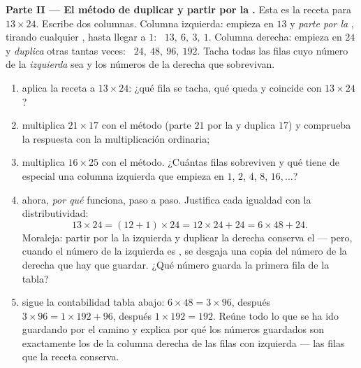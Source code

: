 \begin{problem}
\medskip
\noindent\textbf{Parte II --- El método de duplicar y partir por la .}
Esta es la receta para $13 \times 24$. Escribe dos columnas. Columna
izquierda: empieza en $13$ y \emph{parte por la }, tirando cualquier ,
hasta llegar a $1$: \ $13,\ 6,\ 3,\ 1$. Columna derecha: empieza en $24$ y
\emph{duplica} otras tantas veces: \ $24,\ 48,\ 96,\ 192$. Tacha
todas las filas cuyo número de la \emph{izquierda} sea  y  los
números de la derecha que sobrevivan.
\begin{enumerate}[resume]
  \item aplica la receta a $13 \times 24$: ¿qué fila se
        tacha, qué  queda y coincide con
        $13 \times 24$?
  \item multiplica $21 \times 17$ con el método (parte $21$ por la  y duplica
        $17$) y comprueba la respuesta con la multiplicación ordinaria;
  \item multiplica $16 \times 25$ con el método. ¿Cuántas filas
        sobreviven y qué tiene de especial una columna izquierda que
        empieza en $1$, $2$, $4$, $8$, $16, \dots$?
  \item ahora, \emph{por qué} funciona, paso a paso. Justifica cada
        igualdad con la distributividad:
        \[
        13 \times 24 = (12 + 1) \times 24
        = 12 \times 24 + 24 = 6 \times 48 + 24 .
        \]
        Moraleja: partir por la  la izquierda y duplicar la derecha conserva el
         --- pero, cuando el número de la izquierda es \emph{}, se
        desgaja una copia del número de la derecha que hay que guardar.
        ¿Qué número guarda la primera fila de la tabla?
  \item sigue la contabilidad tabla abajo:
        $6 \times 48 = 3 \times 96$, después
        $3 \times 96 = 1 \times 192 + 96$, después
        $1 \times 192 = 192$. Reúne todo lo que se ha ido guardando
        por el camino y explica por qué los números guardados son
        exactamente los de la columna derecha de las filas con izquierda 
        --- las filas que la receta conserva.
\end{enumerate}


\end{problem}
